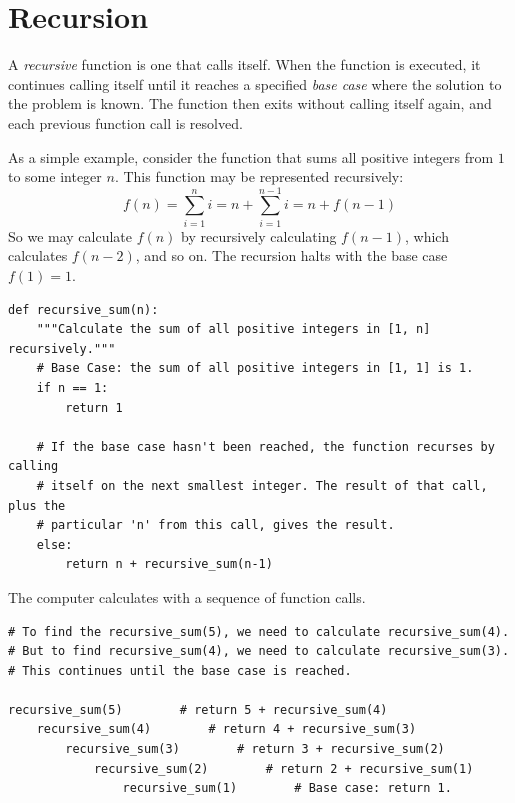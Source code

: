 \label{lab:Python_DataStructures2}




\section*{Recursion}

A \emph{recursive} function is one that calls itself.
When the function is executed, it continues calling itself until it reaches a specified \emph{base case} where the solution to the problem is known.
The function then exits without calling itself again, and each previous function call is resolved.

As a simple example, consider the function that sums all positive integers from $1$ to some integer $n$.
This function may be represented recursively:
\[f(n) = \sum_{i=1}^ni = n + \sum_{i=1}^{n-1}i = n + f(n-1)\]
So we may calculate $f(n)$ by recursively calculating $f(n-1)$, which calculates $f(n-2)$, and so on.
The recursion halts with the base case $f(1) = 1$.

\begin{lstlisting}
def recursive_sum(n):
	"""Calculate the sum of all positive integers in [1, n] recursively."""
    # Base Case: the sum of all positive integers in [1, 1] is 1.
	if n == 1:
		return 1

	# If the base case hasn't been reached, the function recurses by calling
    # itself on the next smallest integer. The result of that call, plus the
    # particular 'n' from this call, gives the result.
	else:
		return n + recursive_sum(n-1)
\end{lstlisting}

The computer calculates  with a sequence of function calls.

\begin{lstlisting}
# To find the recursive_sum(5), we need to calculate recursive_sum(4).
# But to find recursive_sum(4), we need to calculate recursive_sum(3).
# This continues until the base case is reached.

recursive_sum(5)		# return 5 + recursive_sum(4)
	recursive_sum(4)		# return 4 + recursive_sum(3)
		recursive_sum(3)		# return 3 + recursive_sum(2)
			recursive_sum(2)		# return 2 + recursive_sum(1)
				recursive_sum(1)		# Base case: return 1.
\end{lstlisting}

